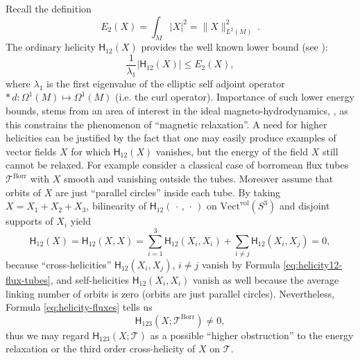 \documentclass[12pt]{article}
\newcommand{\Cnf}{\text{Conf}}
\begin{document}
Recall the definition
\begin{equation}\label{eq:energy}
 E_2(X)=\int_M |X|^2 = \|X\|^2_{L^2(M)}\ .
\end{equation}
The ordinary helicity $\mathsf{H}_{12}(X)$ provides the well known lower bound (see \cite[p. 123]{Khesin98}):
\[
  \frac{1}{\lambda_1}|\mathsf{H}_{12}(X)|\leq  E_2(X),
\]
where $\lambda_1$ is the first eigenvalue of the elliptic self adjoint operator $\ast\,d:\Omega^1(M)\mapsto \Omega^1(M)$
(i.e. the curl operator). Importance of such lower energy bounds,
 stems from an area of interest in the ideal magneto-hydrodynamics, \cite{Priest84}, as this constrains the phenomenon of ``magnetic relaxation''.
A need for higher helicities can be justified by the fact that one may easily produce examples of vector fields $X$ for which $\mathsf{H}_{12}(X)$ vanishes, but the energy of the field $X$ still cannot be relaxed. For example consider a classical case of borromean flux tubes $\mathcal{T}^\text{Borr}$ with $X$ smooth and vanishing outside the tubes. Moreover assume that orbits of $X$ are just ``parallel 
circles'' inside each tube. By taking $X=X_1+X_2+X_3$, bilinearity of $\mathsf{H}_{12}(\,\cdot\,,\,\cdot\,)$ on $\text{Vect}^\text{vol}(S^3)$ and disjoint supports of $X_i$  yield
\[
 \mathsf{H}_{12}(X)=\mathsf{H}_{12}(X,X)=\sum^3_{i=1}\mathsf{H}_{12}(X_i,X_i)+\sum_{i\neq j} \mathsf{H}_{12}(X_i,X_j)=0,
\]
because ``cross-helicities'' $\mathsf{H}_{12}(X_i,X_j)$, $i\neq j$ vanish by Formula \eqref{eq:helicity12-flux-tubes}, and self-helicities $\mathsf{H}_{12}(X_i,X_i)$ vanish as well because the average linking number of orbits is zero (orbits are just parallel 
circles). Nevertheless, Formula \eqref{eq:helicity-fluxes} tells us 
\[
\mathsf{H}_{123}(X;\mathcal{T}^\text{Borr})\neq 0,
\]
thus we may regard $\mathsf{H}_{123}(X;\mathcal{T})$ as a possible ``higher obstruction'' to the energy relaxation or the third order cross-helicity of $X$ on $\mathcal{T}$.


\end{document}
